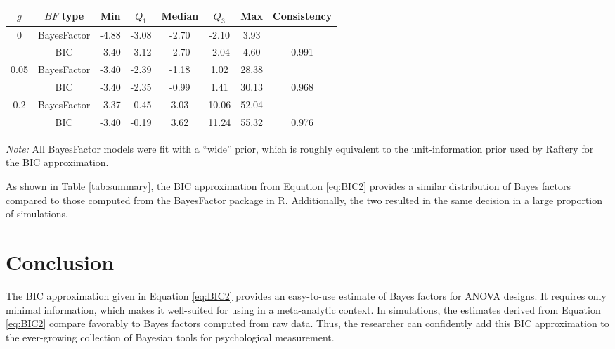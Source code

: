 \documentclass[]{article}
\begin{document}
\begin{table*}[h]
	\vspace*{2em}
	\begin{threeparttable}
	\caption{Summary of simulation results for $n=50$}
	\label{tab:summary}
	\begin{tabular}{cccccccc} 
          \toprule
          $g$ & $BF$ type & Min & $Q_1$ & Median & $Q_3$ & Max & Consistency\\
          \midrule
                    0 & BayesFactor & -4.88 & -3.08 & -2.70 & -2.10 & 3.93 & \\
                    & BIC & -3.40 & -3.12 & -2.70 & -2.04 & 4.60 & 0.991 \\[2mm]

                    0.05 & BayesFactor & -3.40 & -2.39 & -1.18 & 1.02 & 28.38 & \\
              & BIC & -3.40 & -2.35 & -0.99 & 1.41 & 30.13 & 0.968\\[2mm]

          0.2 & BayesFactor & -3.37 & -0.45 & 3.03 & 10.06 & 52.04 & \\
              & BIC & -3.40 & -0.19 & 3.62 & 11.24 & 55.32 & 0.976\\
          \midrule


	\end{tabular}
        \begin{tablenotes}
        \item {\small\textit{Note:} All BayesFactor models were fit with a ``wide'' prior, which is roughly equivalent to the unit-information prior used by Raftery \cite{raftery1995} for the BIC approximation.}
        \end{tablenotes}

	\end{threeparttable}
\end{table*}

As shown in Table \ref{tab:summary}, the BIC approximation from Equation \ref{eq:BIC2} provides a similar distribution of Bayes factors compared to those computed from the BayesFactor package in R.  Additionally, the two resulted in the same decision in a large proportion of simulations.

\section{Conclusion}
The BIC approximation given in Equation \ref{eq:BIC2} provides an easy-to-use estimate of Bayes factors for ANOVA designs.  It requires only minimal information, which makes it well-suited for using in a meta-analytic context.  In simulations, the estimates derived from Equation \ref{eq:BIC2} compare favorably to Bayes factors computed from raw data.  Thus, the researcher can confidently add this BIC approximation to the ever-growing collection of Bayesian tools for psychological measurement.




\end{document}
